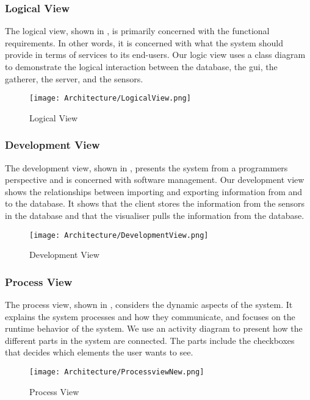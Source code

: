 \documentclass[../document.tex]{subfiles}
\begin{document}
\subsubsection{Logical View}		
The logical view, shown in , is primarily concerned with the functional requirements. In other words, it is concerned with what the system should provide in terms of services to its end-users. Our logic view uses a class diagram to demonstrate the logical interaction between the database, the gui, the gatherer, the server, and the sensors. 


\begin{figure}[H]
	\centering
	\texttt{[image: Architecture/LogicalView.png]}
	\caption{Logical View}
	\label{fig:LogicalView}
\end{figure}

\subsubsection{Development View}
The development view, shown in ,  presents the system from a programmers perspective and is concerned with software management. Our development view shows the relationships between importing and exporting information from and to the database. It shows that the client stores the information from the sensors in the database and that the visualiser pulls the information from the database.

\begin{figure}[H]
	\centering
	\texttt{[image: Architecture/DevelopmentView.png]}
	\caption{Development View}
	\label{fig:DevelopmentView}
\end{figure}

\subsubsection{Process View}
The process view, shown in , considers the dynamic aspects of the system. It explains the system processes and how they communicate, and focuses on the runtime behavior of the system. We use an activity diagram to present how the different parts in the system are connected. The parts include the checkboxes that decides which elements the user wants to see. 

\begin{figure}[H]
	\centering
	\texttt{[image: Architecture/ProcessviewNew.png]}
	\caption{Process View}
	\label{fig:ProcessView}
\end{figure}
\end{document}

